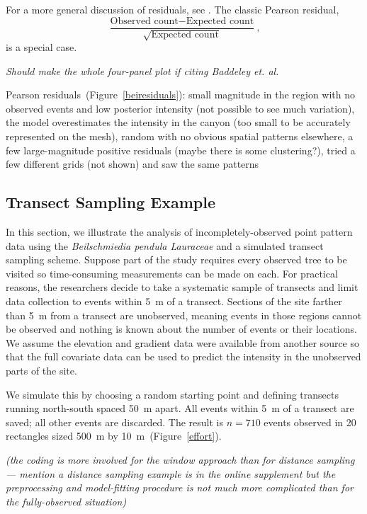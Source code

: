 \documentclass[]{interact}
\begin{document}
For a more general discussion of residuals, see \cite{baddeleyresiduals}. The
classic Pearson residual,
\begin{displaymath}
\frac{\text{Observed count} - \text{Expected count}}
{\sqrt{\text{Expected count}}},
\end{displaymath}
is a special case.

{\it Should make the whole four-panel plot if citing Baddeley et. al.}

Pearson residuals~(Figure~\ref{beiresiduals}): small magnitude in the region
with no observed events and low posterior intensity (not possible to see much
variation), the model overestimates the intensity in the canyon (too small to
be accurately represented on the mesh), random with no obvious spatial patterns
elsewhere, a few large-magnitude positive residuals (maybe there is some
clustering?), tried a few different grids (not shown) and saw the same patterns


\subsection{Transect Sampling Example}
\label{xsectanalysis}

In this section, we illustrate the analysis of incompletely-observed point
pattern data using the \emph{Beilschmiedia pendula Lauraceae} and a simulated
transect sampling scheme. Suppose part of the study requires every observed
tree to be visited so time-consuming measurements can be made on each. For
practical reasons, the researchers decide to take a systematic sample of
transects and limit data collection to events within 5~m of a transect.
Sections of the site farther than 5~m from a transect are unobserved, meaning
events in those regions cannot be observed and nothing is known about the
number of events or their locations. We assume the elevation and gradient data
were available from another source so that the full covariate data can be used
to predict the intensity in the unobserved parts of the site.

We simulate this by choosing a random starting point and defining transects
running north-south spaced 50~m apart. All events within 5~m of a transect are
saved; all other events are discarded. The result is \(n = 710\) events
observed in 20 rectangles sized 500~m by 10~m~(Figure~\ref{effort}).

{\it (the coding is more involved for the window approach than for distance
sampling --- mention a distance sampling example is in the online supplement
but the preprocessing and model-fitting procedure is not much more complicated
than for the fully-observed situation)}
\end{document}
